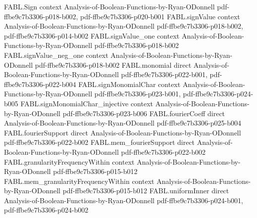 \begin{theorem}
\label{FABL.averageInfluence_toReal_eq_averageCoordinateFlipProbability}
\leanok
{}
\proofstep
  {FABL.Sign}
  {context}
  {Analysis-of-Boolean-Functions-by-Ryan-ODonnell}
  {pdf-ffbe9c7b3306-p018-b002,
    pdf-ffbe9c7b3306-p020-b001}
\proofstep
  {FABL.signValue}
  {context}
  {Analysis-of-Boolean-Functions-by-Ryan-ODonnell}
  {pdf-ffbe9c7b3306-p018-b002,
    pdf-ffbe9c7b3306-p014-b002}
\proofstep
  {FABL.signValue_one}
  {context}
  {Analysis-of-Boolean-Functions-by-Ryan-ODonnell}
  {pdf-ffbe9c7b3306-p018-b002}
\proofstep
  {FABL.signValue_neg_one}
  {context}
  {Analysis-of-Boolean-Functions-by-Ryan-ODonnell}
  {pdf-ffbe9c7b3306-p018-b002}
\proofstep
  {FABL.monomial}
  {direct}
  {Analysis-of-Boolean-Functions-by-Ryan-ODonnell}
  {pdf-ffbe9c7b3306-p022-b001,
    pdf-ffbe9c7b3306-p022-b004}
\proofstep
  {FABL.signMonomialChar}
  {context}
  {Analysis-of-Boolean-Functions-by-Ryan-ODonnell}
  {pdf-ffbe9c7b3306-p023-b001,
    pdf-ffbe9c7b3306-p024-b005}
\proofstep
  {FABL.signMonomialChar_injective}
  {context}
  {Analysis-of-Boolean-Functions-by-Ryan-ODonnell}
  {pdf-ffbe9c7b3306-p023-b006}
\proofstep
  {FABL.fourierCoeff}
  {direct}
  {Analysis-of-Boolean-Functions-by-Ryan-ODonnell}
  {pdf-ffbe9c7b3306-p025-b004}
\proofstep
  {FABL.fourierSupport}
  {direct}
  {Analysis-of-Boolean-Functions-by-Ryan-ODonnell}
  {pdf-ffbe9c7b3306-p022-b002}
\proofstep
  {FABL.mem_fourierSupport}
  {direct}
  {Analysis-of-Boolean-Functions-by-Ryan-ODonnell}
  {pdf-ffbe9c7b3306-p022-b002}
\proofstep
  {FABL.granularityFrequencyWithin}
  {context}
  {Analysis-of-Boolean-Functions-by-Ryan-ODonnell}
  {pdf-ffbe9c7b3306-p015-b012}
\proofstep
  {FABL.mem_granularityFrequencyWithin}
  {context}
  {Analysis-of-Boolean-Functions-by-Ryan-ODonnell}
  {pdf-ffbe9c7b3306-p015-b012}
\proofstep
  {FABL.uniformInner}
  {direct}
  {Analysis-of-Boolean-Functions-by-Ryan-ODonnell}
  {pdf-ffbe9c7b3306-p024-b001,
    pdf-ffbe9c7b3306-p024-b002}
\proofstep

\end{theorem}
